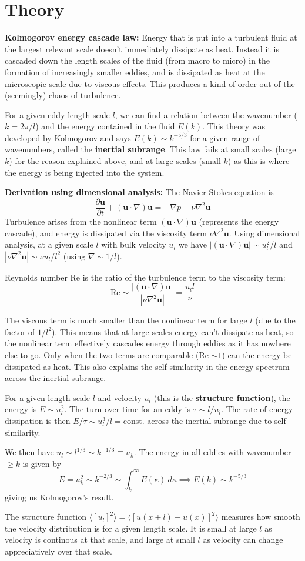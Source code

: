 \documentclass[12pt,letterpaper]{article}
\newcommand{\B}[1]{\mathbf{#1}}
\begin{document}
  \section*{Theory}
  \textbf{Kolmogorov energy cascade law: } Energy that is put into a turbulent fluid at the largest relevant scale doesn't immediately dissipate as heat. Instead it is cascaded down the length scales of the fluid (from macro to micro) in the formation of increasingly smaller eddies, and is dissipated as heat at the microscopic scale due to viscous effects. This produces a kind of order out of the (seemingly) chaos of turbulence.

  For a given eddy length scale $l$, we can find a relation between the wavenumber ($k=2\pi/l$) and the energy contained in the fluid $E(k)$. This theory was developed by Kolmogorov and says $E(k)\sim k^{-5/3}$ for a given range of wavenumbers, called the \textbf{inertial subrange}. This law fails at small scales (large $k$) for the reason explained above, and at large scales (small $k$) as this is where the energy is being injected into the system.

  \textbf{Derivation using dimensional analysis:} The Navier-Stokes equation is
  $$
    \frac{\partial \B{u}}{\partial t} + (\B{u}\cdot\nabla)\B{u} = -\nabla p + \nu \nabla^2\B{u}
  $$
  Turbulence arises from the nonlinear term $(\B{u}\cdot\nabla)\B{u}$ (represents the energy cascade), and energy is dissipated via the viscosity term $\nu \nabla^2\B{u}$. Using dimensional analysis, at a given scale $l$ with bulk velocity $u_l$ we have $|(\B{u}\cdot \nabla)\B{u}|\sim u^2_l/l$ and $|\nu \nabla^2 \B{u}|\sim \nu u_l / l^2$ (using $\nabla \sim 1/l$).

  Reynolds number Re is the ratio of the turbulence term to the viscosity term:
  $$
    \text{Re} \sim \frac{|(\B{u}\cdot \nabla)\B{u}|}{|\nu \nabla^2 \B{u}|} = \frac{u_l l}{\nu}
  $$

  The viscous term is much smaller than the nonlinear term for large $l$ (due to the factor of $1/l^2$). This means that at large scales energy can't dissipate as heat, so the nonlinear term effectively cascades energy through eddies as it has nowhere else to go. Only when the two terms are comparable (Re $\sim 1$) can the energy be dissipated as heat. This also explains the self-similarity in the energy spectrum across the inertial subrange.

  For a given length scale $l$ and velocity $u_l$ (this is the \textbf{structure function}), the energy is $E\sim u^2_l$. The turn-over time for an eddy is $\tau\sim l/u_l$. The rate of energy dissipation is then $E/\tau \sim u^3_l/l=\text{const.}$ across the inertial subrange due to self-similarity.

  We then have $u_l\sim l^{1/3}\sim k^{-1/3} \equiv u_k$. The energy in all eddies with wavenumber $\geq k$  is given by
  $$
  E = u^2_k \sim k^{-2/3} \sim \int_k^\infty E(\kappa) \ d\kappa  \implies E(k) \sim k^{-5/3}
  $$
  giving us Kolmogorov's result.

  The structure function $\langle[u_l]^2 \rangle = \langle [u(x+l)-u(x)]^2\rangle$ measures how smooth the velocity distribution is for a given length scale. It is small at large $l$ as velocity is continous at that scale, and large at small $l$ as velocity can change appreciatively over that scale.
\end{document}
